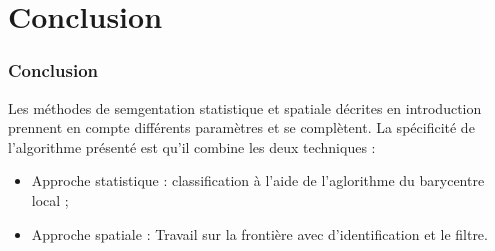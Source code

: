 \documentclass[handout]{beamer}
\begin{document}
	\section{Conclusion}

		\begin{frame}
			\frametitle{Conclusion}
			Les méthodes de semgentation statistique et spatiale décrites en introduction prennent en compte différents paramètres et se complètent. La spécificité de l'algorithme présenté est qu'il combine les deux techniques : 
			\begin{itemize}
				\item Approche statistique : classification à l'aide de l'aglorithme du barycentre local ;
				\item Approche spatiale : Travail sur la frontière avec d'identification et le filtre.
			\end{itemize}


		\end{frame}
\end{document}
